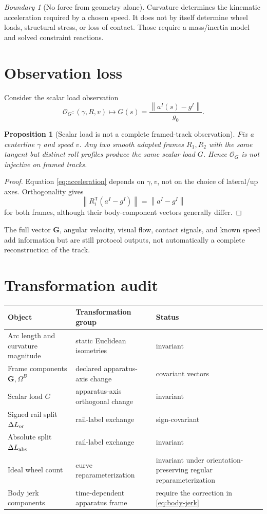 \documentclass[11pt,a4paper]{article}
\theoremstyle{definition}
\theoremstyle{plain}
\newtheorem{proposition}[definition]{Proposition}
\theoremstyle{remark}
\newtheorem{warning}[definition]{Boundary}
\newcommand{\norm}[1]{\left\lVert #1\right\rVert}
\newcommand{\Ocal}{\mathcal O}
\begin{document}
\begin{warning}[No force from geometry alone]
Curvature determines the kinematic acceleration required by a chosen
speed. It does not by itself determine wheel loads, structural stress,
or loss of contact. Those require a mass/inertia model and solved
constraint reactions.
\end{warning}

\section{Observation loss}

Consider the scalar load observation
\[
\Ocal_G:(\gamma,R,v)\longmapsto
G(s)=\frac{\norm{a^I(s)-g^I}}{g_0}.
\]

\begin{proposition}[Scalar load is not a complete framed-track
observation]
Fix a centerline \(\gamma\) and speed \(v\). Any two smooth adapted
frames \(R_1,R_2\) with the same tangent but distinct roll profiles
produce the same scalar load \(G\). Hence \(\Ocal_G\) is not injective
on framed tracks.
\end{proposition}

\begin{proof}
Equation \cref{eq:acceleration} depends on \(\gamma,v\), not on the
choice of lateral/up axes. Orthogonality gives
\[
\norm{R_i^{\mathsf T}(a^I-g^I)}
=\norm{a^I-g^I}
\]
for both frames, although their body-component vectors generally
differ.
\end{proof}

The full vector \(\bm G\), angular velocity, visual flow, contact
signals, and known speed add information but are still protocol
outputs, not automatically a complete reconstruction of the track.

\section{Transformation audit}

\begin{longtable}{L{34mm}L{48mm}L{68mm}}
\toprule
Object & Transformation group & Status \\
\midrule
\endhead
Arc length and curvature magnitude & static Euclidean isometries &
invariant \\
Frame components \(\bm G,\Omega^B\) & declared apparatus-axis change &
covariant vectors \\
Scalar load \(G\) & apparatus-axis orthogonal change & invariant \\
Signed rail split \(\Delta L_{\rm or}\) & rail-label exchange &
sign-covariant \\
Absolute split \(\Delta L_{\rm abs}\) & rail-label exchange &
invariant \\
Ideal wheel count & curve reparameterization & invariant under
orientation-preserving regular reparameterization \\
Body jerk components & time-dependent apparatus frame & require the
correction in \cref{eq:body-jerk} \\
\bottomrule
\end{longtable}
\end{document}
